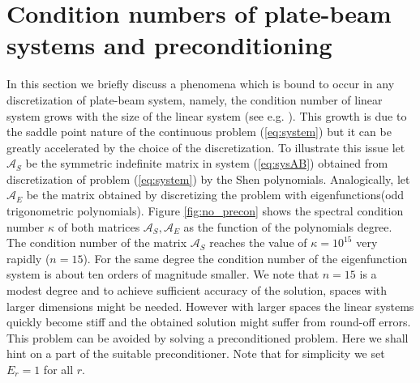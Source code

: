 \documentclass{marine_2015}
\begin{document}
\section{Condition numbers of plate-beam systems and preconditioning}
\label{sec:lbb}
In this section we briefly discuss a phenomena which is bound to occur in any
discretization of plate-beam system, namely, the condition number of linear system 
grows with the size of the linear system (see e.g.
\cite{benzi}). This growth is due to the saddle point nature of the continuous
problem (\ref{eq:system}) but it can be greatly accelerated by the choice of the
discretization. To illustrate this issue let $\mathcal{A}_S$ be the symmetric
indefinite matrix in system (\ref{eq:sysAB}) obtained from discretization of
problem (\ref{eq:system}) by the Shen polynomials. Analogically, let
$\mathcal{A}_E$ be the matrix obtained by discretizing the problem with
eigenfunctions(odd trigonometric polynomials). Figure \ref{fig:no_precon} shows the 
spectral condition number $\kappa$ of both matrices $\mathcal{A}_S, \mathcal{A}_E$ 
as the function of the polynomials degree. The condition number of the matrix
$\mathcal{A}_S$ reaches the value of $\kappa=10^{15}$ very rapidly ($n=15$). For
the same degree the condition number of the eigenfunction system is about ten 
orders of magnitude smaller. We note that $n=15$ is a modest degree and to achieve
sufficient accuracy of the solution, spaces with larger dimensions might be
needed. However with larger spaces the linear systems quickly become stiff and
the obtained solution might suffer from round-off errors. This problem can be
avoided by solving a preconditioned problem. Here we shall hint on a part of the
suitable preconditioner. Note that for simplicity we set $E_r=1$ for all $r$.
\end{document}
